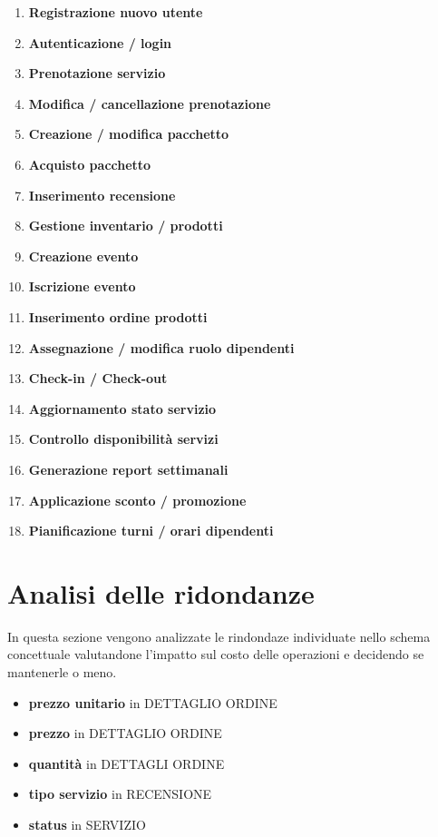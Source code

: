 \documentclass[a4paper,12pt]{report}
\begin{document}
\begin{enumerate}
	\item \textbf{Registrazione nuovo utente} \label{op1}
	\item \textbf{Autenticazione / login} \label{op2}
	\item \textbf{Prenotazione servizio} \label{op3}
	\item \textbf{Modifica / cancellazione prenotazione} \label{op4}
	\item \textbf{Creazione / modifica pacchetto} \label{op5}
	\item \textbf{Acquisto pacchetto} \label{op6}
	\item \textbf{Inserimento recensione} \label{op7}
	\item \textbf{Gestione inventario / prodotti} \label{op8}
	\item \textbf{Creazione evento} \label{op9}
	\item \textbf{Iscrizione evento} \label{op10}
	\item \textbf{Inserimento ordine prodotti} \label{op11}
	\item \textbf{Assegnazione / modifica ruolo dipendenti} \label{op12}
	\item \textbf{Check-in / Check-out} \label{op13}
	\item \textbf{Aggiornamento stato servizio} \label{op14}
	\item \textbf{Controllo disponibilità servizi} \label{op15}
	\item \textbf{Generazione report settimanali} \label{op16}
	\item \textbf{Applicazione sconto / promozione} \label{op17}
	\item \textbf{Pianificazione turni / orari dipendenti} \label{op18}
\end{enumerate}

\section{Analisi delle ridondanze}
In questa sezione vengono analizzate le rindondaze individuate nello schema concettuale valutandone l'impatto sul
costo delle operazioni e decidendo se mantenerle o meno.

\begin{itemize}
	\item \textbf{prezzo unitario} in DETTAGLIO ORDINE
	\item \textbf{prezzo} in DETTAGLIO ORDINE
	\item \textbf{quantità} in DETTAGLI ORDINE
	\item \textbf{tipo servizio} in RECENSIONE
	\item \textbf{status} in SERVIZIO
\end{itemize}
\end{document}
